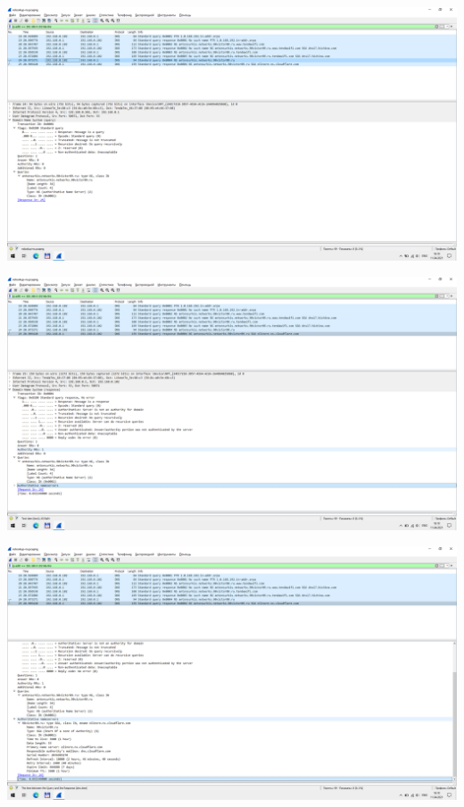 \includegraphics[width=\textwidth]{screenshots/nslookup-ns_request_1}

\includegraphics[width=\textwidth]{screenshots/nslookup-ns_response_1}

\includegraphics[width=\textwidth]{screenshots/nslookup-ns_response_2}
